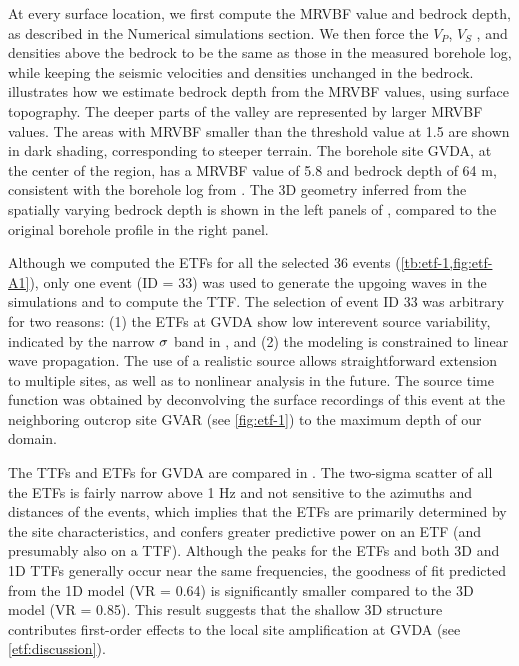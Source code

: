 At every surface location, we first compute the MRVBF value and bedrock depth, as described in the Numerical simulations section. We then force the $V_P$, $V_S$ , and densities above the bedrock to be the same as those in the measured borehole log, while keeping the seismic velocities and densities unchanged in the bedrock.  illustrates how we estimate bedrock depth from the MRVBF values, using surface topography. The deeper parts of the valley are represented by larger MRVBF values. The areas with MRVBF smaller than the threshold value at 1.5 are shown in dark shading, corresponding to steeper terrain. The borehole site GVDA, at the center of the region, has a MRVBF value of 5.8 and bedrock depth of 64 m, consistent with the borehole log from \citet{gibbsNearsurfaceSwaveVelocities1989}. The 3D geometry inferred from the spatially varying bedrock depth is shown in the left panels of , compared to the original borehole profile in the right panel.

Although we computed the ETFs for all the selected 36 events (\cref{tb:etf-1,fig:etf-A1}), only one event (ID = 33) was used to generate the upgoing waves in the simulations and to compute the TTF. The selection of event ID 33 was arbitrary for two reasons: (1) the ETFs at GVDA show low interevent source variability, indicated by the narrow $\rm \sigma$ band in , and (2) the modeling is constrained to linear wave propagation. The use of a realistic source allows straightforward extension to multiple sites, as well as to nonlinear analysis in the future. The source time function was obtained by deconvolving the surface recordings of this event at the neighboring outcrop site GVAR (see \cref{fig:etf-1}) to the maximum depth of our domain.

The TTFs and ETFs for GVDA are compared in . The two-sigma scatter of all the ETFs is fairly narrow above 1 Hz and not sensitive to the azimuths and distances of the events, which implies that the ETFs are primarily determined by the site characteristics, and confers greater predictive power on an ETF (and presumably also on a TTF). Although the peaks for the ETFs and both 3D and 1D TTFs generally occur near the same frequencies, the goodness of fit predicted from the 1D model (VR = 0.64) is significantly smaller compared to the 3D model (VR = 0.85). This result suggests that the shallow 3D structure contributes first-order effects to the local site amplification at GVDA (see \cref{etf:discussion}).

